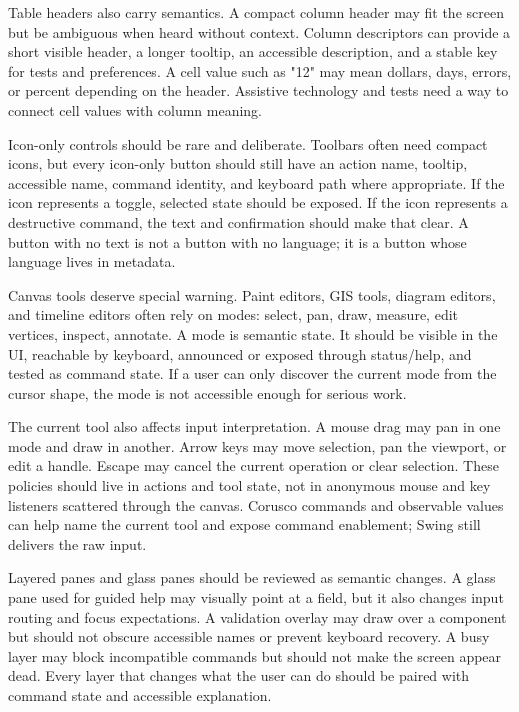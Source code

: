 Table headers also carry semantics. A compact column header may fit the screen
but be ambiguous when heard without context. Column descriptors can provide a
short visible header, a longer tooltip, an accessible description, and a stable
key for tests and preferences. A cell value such as "12" may mean dollars,
days, errors, or percent depending on the header. Assistive technology and tests
need a way to connect cell values with column meaning.

Icon-only controls should be rare and deliberate. Toolbars often need compact
icons, but every icon-only button should still have an action name, tooltip,
accessible name, command identity, and keyboard path where appropriate. If the
icon represents a toggle, selected state should be exposed. If the icon
represents a destructive command, the text and confirmation should make that
clear. A button with no text is not a button with no language; it is a button
whose language lives in metadata.

Canvas tools deserve special warning. Paint editors, GIS tools, diagram
editors, and timeline editors often rely on modes: select, pan, draw, measure,
edit vertices, inspect, annotate. A mode is semantic state. It should be visible
in the UI, reachable by keyboard, announced or exposed through status/help, and
tested as command state. If a user can only discover the current mode from the
cursor shape, the mode is not accessible enough for serious work.

The current tool also affects input interpretation. A mouse drag may pan in one
mode and draw in another. Arrow keys may move selection, pan the viewport, or
edit a handle. Escape may cancel the current operation or clear selection. These
policies should live in actions and tool state, not in anonymous mouse and key
listeners scattered through the canvas. Corusco commands and observable values
can help name the current tool and expose command enablement; Swing still
delivers the raw input.

Layered panes and glass panes should be reviewed as semantic changes. A glass
pane used for guided help may visually point at a field, but it also changes
input routing and focus expectations. A validation overlay may draw over a
component but should not obscure accessible names or prevent keyboard recovery.
A busy layer may block incompatible commands but should not make the screen
appear dead. Every layer that changes what the user can do should be paired with
command state and accessible explanation.


